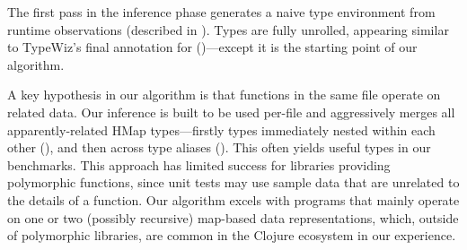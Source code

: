 %
%


The first pass in the inference phase generates a naive type environment
from runtime observations (described in ). Types are fully unrolled, appearing
similar to TypeWiz's final annotation for 
()---except it is the starting point of
our algorithm.

A key hypothesis in our algorithm is that functions in the same
file operate on related data. Our inference is built
to be used per-file and aggressively merges all apparently-related HMap
types---firstly types immediately nested within each other (),
and then across type aliases
().
This often yields useful types in our benchmarks.
This approach has limited success for libraries providing polymorphic
functions, since unit tests may use sample data that are unrelated
to the details of a function.
Our algorithm excels
with programs that mainly operate on one or two (possibly recursive) map-based
data representations,
which, outside of polymorphic libraries, are common in the Clojure ecosystem
in our experience.

